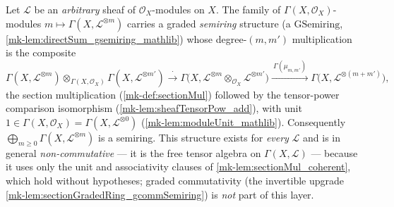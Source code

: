 \begin{lemma}
\label{mk-lem:sectionGradedRing_gsemiring}
  \leanok

  Let \(\mathcal{L}\) be an \emph{arbitrary} sheaf of \(\mathcal{O}_X\)-modules on
  \(X\). The family of \(\Gamma(X,\mathcal{O}_X)\)-modules
  \(m \mapsto \Gamma(X, \mathcal{L}^{\otimes m})\) carries a graded
  \emph{semiring} structure (a \(\mathrm{GSemiring}\),
  \ref{mk-lem:directSum_gsemiring_mathlib}) whose degree-\((m,m')\) multiplication is
  the composite
  \[
    \Gamma(X, \mathcal{L}^{\otimes m}) \otimes_{\Gamma(X,\mathcal{O}_X)}
      \Gamma(X, \mathcal{L}^{\otimes m'})
    \xrightarrow{\ \cdot\ }
    \Gamma\bigl(X, \mathcal{L}^{\otimes m} \otimes_{\mathcal{O}_X}
      \mathcal{L}^{\otimes m'}\bigr)
    \xrightarrow{\ \Gamma(\mu_{m,m'})\ }
    \Gamma\bigl(X, \mathcal{L}^{\otimes (m+m')}\bigr),
  \]
  the section multiplication (\ref{mk-def:sectionMul}) followed by the tensor-power
  comparison isomorphism (\ref{mk-lem:sheafTensorPow_add}), with unit
  \(1 \in \Gamma(X, \mathcal{O}_X) = \Gamma(X, \mathcal{L}^{\otimes 0})\)
  (\ref{mk-lem:moduleUnit_mathlib}). Consequently
  \(\bigoplus_{m \ge 0} \Gamma(X, \mathcal{L}^{\otimes m})\) is a semiring. This
  structure exists for \emph{every} \(\mathcal{L}\) and is in general
  \emph{non-commutative} --- it is the free tensor algebra on
  \(\Gamma(X,\mathcal{L})\) --- because it uses only the unit and associativity
  clauses of \ref{mk-lem:sectionMul_coherent}, which hold without hypotheses; graded
  commutativity (the invertible upgrade \ref{mk-lem:sectionGradedRing_gcommSemiring})
  is \emph{not} part of this layer.
\end{lemma}

